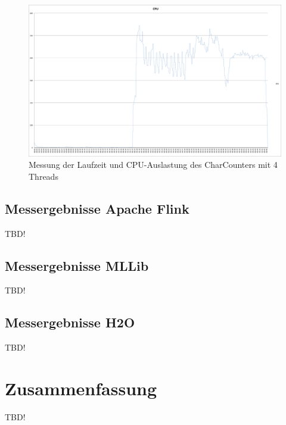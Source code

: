 \begin{figure}[htb!]
\centering
\includegraphics[width=1.0\textwidth]{bilder/SparkCharCount4Thr.png}
\caption{Messung der Laufzeit und CPU-Auslastung des CharCounters mit 4 Threads}
\label{fig:cpu4th}
\end{figure}   

\subsection{Messergebnisse Apache Flink}
\label{section:mllib arch}

TBD!

\subsection{Messergebnisse MLLib}
\label{section:mllib arch}

TBD!

\subsection{Messergebnisse H2O}
\label{section:mllib arch}

TBD!



\section{Zusammenfassung}
\label{section:zusammen}



TBD!
